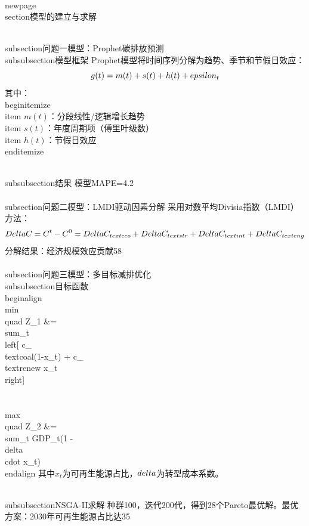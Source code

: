 \\newpage
\\section{模型的建立与求解}

\\subsection{问题一模型：Prophet碳排放预测}
\\subsubsection{模型框架}
Prophet模型将时间序列分解为趋势、季节和节假日效应：
$$g(t) = m(t) + s(t) + h(t) + \\epsilon_t$$
其中：
\\begin{itemize}
    \\item $m(t)$：分段线性/逻辑增长趋势
    \\item $s(t)$：年度周期项（傅里叶级数）
    \\item $h(t)$：节假日效应
\\end{itemize}

\\subsubsection{结果}
模型MAPE=4.2\\%

\\subsection{问题二模型：LMDI驱动因素分解}
采用对数平均Divisia指数（LMDI）方法：
$$\\Delta C = C^t - C^0 = \\Delta C_{\\text{eco}} + \\Delta C_{\\text{str}} + \\Delta C_{\\text{int}} + \\Delta C_{\\text{eng}}$$
分解结果：经济规模效应贡献58\\%

\\subsection{问题三模型：多目标减排优化}
\\subsubsection{目标函数}
\\begin{align}
\\min \\quad Z_1 &= \\sum_t \\left[ c_{\\text{coal}}(1-x_t) + c_{\\text{renew}} x_t \\right] \\\\
\\max \\quad Z_2 &= \\sum_t GDP_t(1 - \\delta \\cdot x_t)
\\end{align}
其中$x_t$为可再生能源占比，$\\delta$为转型成本系数。

\\subsubsection{NSGA-II求解}
种群100，迭代200代，得到28个Pareto最优解。最优方案：2030年可再生能源占比达35\\%
